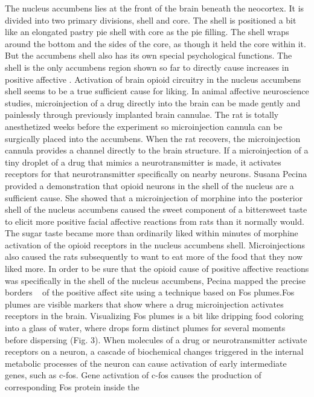 \documentclass[conference]{IEEEtran}
\begin{document}
The nucleus accumbens lies at the front of the brain
beneath the neocortex. It is divided into two primary
divisions, shell and core. The shell is positioned a bit like
an elongated pastry pie shell with core as the pie filling.
The shell wraps around the bottom and the sides of the
core, as though it held the core within it. But the accumbens shell also has its own special psychological
functions. The shell is the only accumbens region shown
so far to directly cause increases in positive affective
. 
Activation of brain opioid circuitry in the nucleus accumbens shell seems to be a true sufficient cause for
liking.
In animal affective neuroscience studies, microinjection of a drug directly into the brain can be made
gently and painlessly through previously implanted
brain cannulae. The rat is totally anesthetized weeks
before the experiment so microinjection cannula can
be surgically placed into the accumbens. When the rat
recovers, the microinjection cannula provides a channel directly to the brain structure. If a microinjection
of a tiny droplet of a drug that mimics a neurotransmitter is made, it activates receptors for that
neurotransmitter specifically on nearby neurons.
Susana Pecina provided a demonstration that opioid 
neurons in the shell of the nucleus are a sufficient cause.
She showed that a microinjection of morphine into the
posterior shell of the nucleus accumbens caused the
sweet component of a bittersweet taste to elicit more
positive facial affective reactions from rats than it normally would. The sugar taste became more than ordinarily liked within minutes of morphine activation of
the opioid receptors in the nucleus accumbens shell.
Microinjections also caused the rats subsequently to
want to eat more of the food that they now liked
more.
In order to be sure that the opioid cause of positive
affective reactions was specifically in the shell of the
nucleus accumbens, Pecina mapped the precise borders ~
of the positive affect site using a technique based on Fos
plumes.Fos plumes are visible markers that show where
a drug microinjection activates receptors in the brain.
Visualizing Fos plumes is a bit like dripping food coloring into a glass of water, where drops form distinct
plumes for several moments before dispersing (Fig. 3).
When molecules of a drug or neurotransmitter activate
receptors on a neuron, a cascade of biochemical changes
triggered in the internal metabolic processes of the
neuron can cause activation of early intermediate
genes, such as c-fos. Gene activation of c-fos causes the
production of corresponding Fos protein inside the
\end{document}

